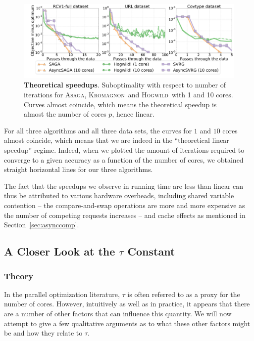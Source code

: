 \documentclass[twoside, 11pt]{article}
\newcommand{\overlap}{\tau}
\newcommand{\ASAGA}{\textsc{Asaga}}
\newcommand{\Hogwild}{\textsc{Hogwild}}
\newcommand{\KROMAGNON}{\textsc{Kromagnon}}
\begin{document}
\begin{figure}
	\includegraphics[width=\linewidth]{figures/figure_2_iterations.pdf}
	\caption{{\bf Theoretical speedups}.
		Suboptimality with respect to number of iterations for \ASAGA, \KROMAGNON\ and \Hogwild\ with 1 and 10 cores.
		Curves almost coincide, which means the theoretical speedup is almost the number of cores $p$, hence linear.}\label{fig:theoretical_speedups}
\end{figure}

For all three algorithms and all three data sets, the curves for $1$ and $10$ cores almost coincide, which means that we are indeed in the ``theoretical linear speedup'' regime.
Indeed, when we plotted the amount of iterations required to converge to a given accuracy as a function of the number of cores, we obtained straight  horizontal lines for our three algorithms.

The fact that the speedups we observe in running time are less than linear can thus be attributed to various hardware overheads, including shared variable contention -- the compare-and-swap operations are more and more expensive as the number of competing requests increases -- and cache effects as mentioned in Section~\ref{sec:asynccomp}.

\subsection{A Closer Look at the $\overlap$ Constant} \label{apxD}\label{sec:overlap}
\subsubsection{Theory}\label{sssec:overlaptheory}
In the parallel optimization literature, $\overlap$ is often referred to as a proxy for the number of cores.
However, intuitively as well as in practice, it appears that there are a number of other factors that can influence this quantity.
We will now attempt to give a few qualitative arguments as to what these other factors might be and how they relate to $\overlap$.
\end{document}
